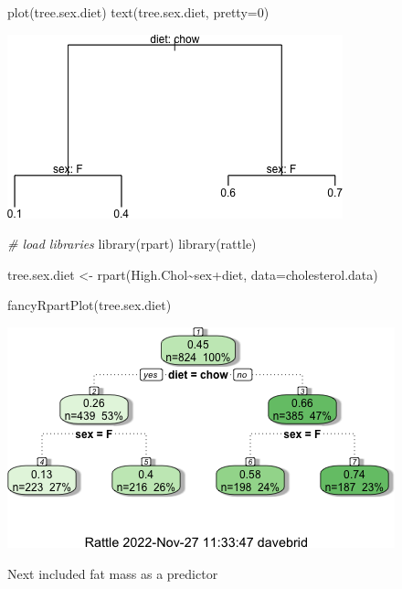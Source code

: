 \documentclass[
]{article}
\newenvironment{Shaded}{\begin{snugshade}}{\end{snugshade}}
\newcommand{\AttributeTok}[1]{\textcolor[rgb]{0.77,0.63,0.00}{#1}}
\newcommand{\CommentTok}[1]{\textcolor[rgb]{0.56,0.35,0.01}{\textit{#1}}}
\newcommand{\DecValTok}[1]{\textcolor[rgb]{0.00,0.00,0.81}{#1}}
\newcommand{\FunctionTok}[1]{\textcolor[rgb]{0.00,0.00,0.00}{#1}}
\newcommand{\NormalTok}[1]{#1}
\newcommand{\OtherTok}[1]{\textcolor[rgb]{0.56,0.35,0.01}{#1}}
\newcommand{\SpecialCharTok}[1]{\textcolor[rgb]{0.00,0.00,0.00}{#1}}
\begin{document}
\begin{Shaded}
\begin{Highlighting}[]
\FunctionTok{plot}\NormalTok{(tree.sex.diet)}
\FunctionTok{text}\NormalTok{(tree.sex.diet, }\AttributeTok{pretty=}\DecValTok{0}\NormalTok{)}
\end{Highlighting}
\end{Shaded}

\includegraphics{figures/sex-diet-tree-1.png}

\begin{Shaded}
\begin{Highlighting}[]
\CommentTok{\# load libraries}
\FunctionTok{library}\NormalTok{(rpart)}
\FunctionTok{library}\NormalTok{(rattle)}

\NormalTok{tree.sex.diet }\OtherTok{\textless{}{-}} \FunctionTok{rpart}\NormalTok{(High.Chol}\SpecialCharTok{\textasciitilde{}}\NormalTok{sex}\SpecialCharTok{+}\NormalTok{diet, }\AttributeTok{data=}\NormalTok{cholesterol.data)}

\FunctionTok{fancyRpartPlot}\NormalTok{(tree.sex.diet)}
\end{Highlighting}
\end{Shaded}

\includegraphics{figures/sex-diet-tree-2.png}

Next included fat mass as a predictor
\end{document}
